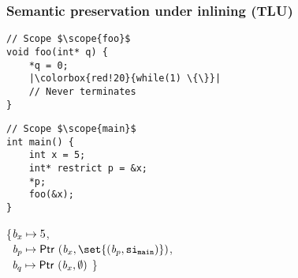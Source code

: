 \begin{frame}[fragile]
\frametitle{Semantic preservation under inlining (TLU)}
\begin{verbatim}
// Scope $\scope{foo}$
void foo(int* q) {
    *q = 0;
    |\colorbox{red!20}{while(1) \{\}}|
    // Never terminates
}
\end{verbatim}


\begin{minipage}{.4\textwidth}
\begin{verbatim}
// Scope $\scope{main}$
int main() {
    int x = 5;
    int* restrict p = &x;
    *p;
    foo(&x);
}
\end{verbatim}
\end{minipage}%
\begin{minipage}{.6\textwidth}
\executionannotation
{
    \{$\textit{b}_x \mapsto 5$, \\
     \ $\Blockvar_p \mapsto \ptr{(\Blockvar_x, \set{(\Blockvar_p, \scope{main})})}$, \\
     \ $\textit{b}_q \mapsto \mathsf{Ptr} \ (\textit{b}_x, \emptyset)$
    \}
}
{
}
\end{minipage}

\end{frame}


